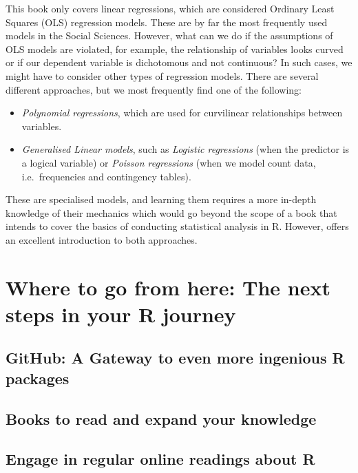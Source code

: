 \documentclass[
]{book}
\begin{document}
This book only covers linear regressions, which are considered Ordinary Least Squares (OLS) regression models. These are by far the most frequently used models in the Social Sciences. However, what can we do if the assumptions of OLS models are violated, for example, the relationship of variables looks curved or if our dependent variable is dichotomous and not continuous? In such cases, we might have to consider other types of regression models. There are several different approaches, but we most frequently find one of the following:

\begin{itemize}
\item
  \emph{Polynomial regressions}, which are used for curvilinear relationships between variables.
\item
  \emph{Generalised Linear models}, such as \emph{Logistic regressions} (when the predictor is a logical variable) or \emph{Poisson regressions} (when we model count data, i.e.~frequencies and contingency tables).
\end{itemize}

These are specialised models, and learning them requires a more in-depth knowledge of their mechanics which would go beyond the scope of a book that intends to cover the basics of conducting statistical analysis in R. However, \citep{cohen2014applied} offers an excellent introduction to both approaches.

\hypertarget{next-steps}{%
\chapter{Where to go from here: The next steps in your R journey}\label{next-steps}}

\hypertarget{next-steps-github}{%
\section{GitHub: A Gateway to even more ingenious R packages}\label{next-steps-github}}

\hypertarget{next-steps-books}{%
\section{Books to read and expand your knowledge}\label{next-steps-books}}

\hypertarget{next-steps-online-readings}{%
\section{Engage in regular online readings about R}\label{next-steps-online-readings}}
\end{document}
